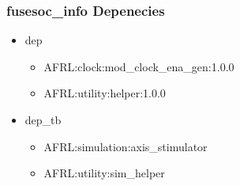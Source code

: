 \subsubsection{fusesoc\_info Depenecies}
\begin{itemize}
\item dep
	\begin{itemize}
	\item AFRL:clock:mod\_clock\_ena\_gen:1.0.0
	\item AFRL:utility:helper:1.0.0
	\end{itemize}
\item dep\_tb
	\begin{itemize}
	\item AFRL:simulation:axis\_stimulator
	\item AFRL:utility:sim\_helper
	\end{itemize}
\end{itemize}
